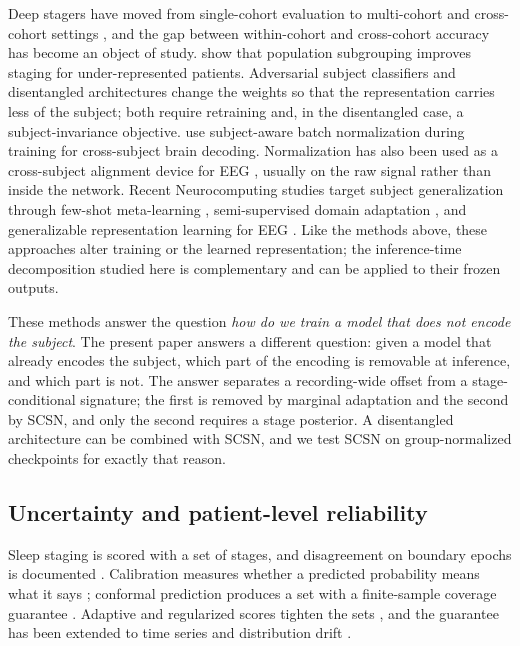 Deep stagers have moved from single-cohort evaluation
\citep{supratak2017,phan2019seqsleepnet} to multi-cohort and cross-cohort
settings \citep{perslev2021,phan2022sleepformer}, and the gap between
within-cohort and cross-cohort accuracy has become an object of study.
\citet{nasiri2021subgrouping} show that population subgrouping improves staging
for under-represented patients. Adversarial subject classifiers
\citep{liao2020trifeaturenet} and disentangled architectures
\citep{s3dnet2026} change the weights so that the representation carries less
of the subject; both require retraining and, in the disentangled case, a
subject-invariance objective. \citet{cross2026} use subject-aware batch
normalization during training for cross-subject brain decoding. Normalization
has also been used as a cross-subject alignment device for EEG
\citep{katthi2021cca}, usually on the raw signal rather than inside the
network.
Recent Neurocomputing studies target subject generalization through few-shot
meta-learning \citep{metasth2026}, semi-supervised domain adaptation
\citep{sedaeeg2025}, and generalizable representation learning for EEG
\citep{transformeeg2026}. Like the methods above, these approaches alter
training or the learned representation; the inference-time decomposition
studied here is complementary and can be applied to their frozen outputs.

These methods answer the question \emph{how do we train a model that does not
encode the subject}. The present paper answers a different question: given a
model that already encodes the subject, which part of the encoding is
removable at inference, and which part is not. The answer separates a
recording-wide offset from a stage-conditional signature; the first is removed
by marginal adaptation and the second by SCSN, and only the second requires a
stage posterior. A disentangled architecture can be combined with SCSN, and we
test SCSN on group-normalized checkpoints for exactly that reason.

\subsection{Uncertainty and patient-level reliability}

Sleep staging is scored with a set of stages, and disagreement on boundary
epochs is documented \citep{rosenberg2013}. Calibration measures whether a
predicted probability means what it says \citep{guo2017}; conformal prediction
produces a set with a finite-sample coverage guarantee
\citep{vovk2005,angelopoulos2023gentle}. Adaptive and regularized scores
tighten the sets \citep{romano2020,angelopoulos2021raps}, and the guarantee has
been extended to time series and distribution drift
\citep{gibbs2021,stankeviciute2021}.

